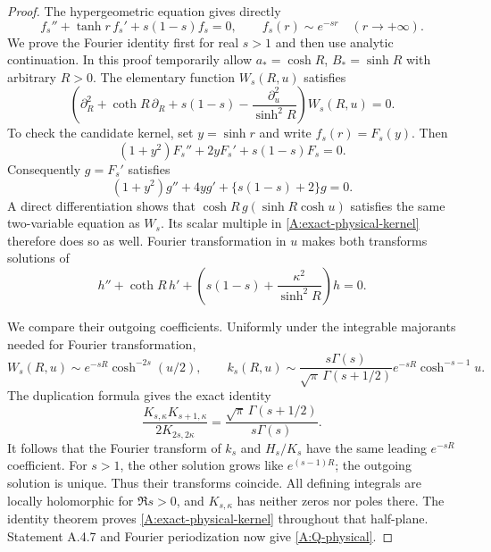 \begin{proof}
The hypergeometric equation gives directly
\[
 f_s''+\tanh r\,f_s'+s(1-s)f_s=0,\qquad
 f_s(r)\sim e^{-sr}\quad(r\to+\infty).
\]
We prove the Fourier identity first for real $s>1$ and then use
analytic continuation. In this proof temporarily allow
$a_*=\cosh R$, $B_*=\sinh R$ with arbitrary $R>0$.
The elementary function $W_s(R,u)$ satisfies
\[
 \left(\partial_R^2+\coth R\,\partial_R+s(1-s)
              -\frac{\partial_u^2}{\sinh^2R}\right)W_s(R,u)=0.
\]
To check the candidate kernel, set $y=\sinh r$ and write $f_s(r)=F_s(y)$.
Then
\[
 (1+y^2)F_s''+2yF_s'+s(1-s)F_s=0.
\]
Consequently $g=F_s'$ satisfies
\[
 (1+y^2)g''+4yg'+\{s(1-s)+2\}g=0.
\]
A direct differentiation shows that
$\cosh R\,g(\sinh R\cosh u)$ satisfies the same two-variable
equation as $W_s$. Its scalar multiple in
\eqref{A:exact-physical-kernel} therefore does so as well.
Fourier transformation in $u$ makes both transforms solutions of
\[
 h''+\coth R\,h'
       +\left(s(1-s)+\frac{\kappa^2}{\sinh^2R}\right)h=0.
\]

We compare their outgoing coefficients. Uniformly under the integrable
majorants needed for Fourier transformation,
\[
 W_s(R,u)\sim e^{-sR}\cosh^{-2s}(u/2),\qquad
 k_s(R,u)\sim
 \frac{s\Gamma(s)}{\sqrt\pi\,\Gamma(s+1/2)}
 e^{-sR}\cosh^{-s-1}u.
\]
The duplication formula gives the exact identity
\[
 \frac{K_{s,\kappa}K_{s+1,\kappa}}
            {2K_{2s,2\kappa}}
   =\frac{\sqrt\pi\,\Gamma(s+1/2)}{s\Gamma(s)}.
\]
It follows that the Fourier transform of $k_s$ and $H_s/K_s$
have the same leading $e^{-sR}$ coefficient.
For $s>1$, the other solution grows like $e^{(s-1)R}$;
the outgoing solution is unique.
Thus their transforms coincide.
All defining integrals are locally holomorphic for $\Re s>0$,
and $K_{s,\kappa}$ has neither zeros nor poles there.
The identity theorem proves \eqref{A:exact-physical-kernel}
throughout that half-plane. Statement A.4.7 and Fourier
periodization now give \eqref{A:Q-physical}.


\end{proof}
